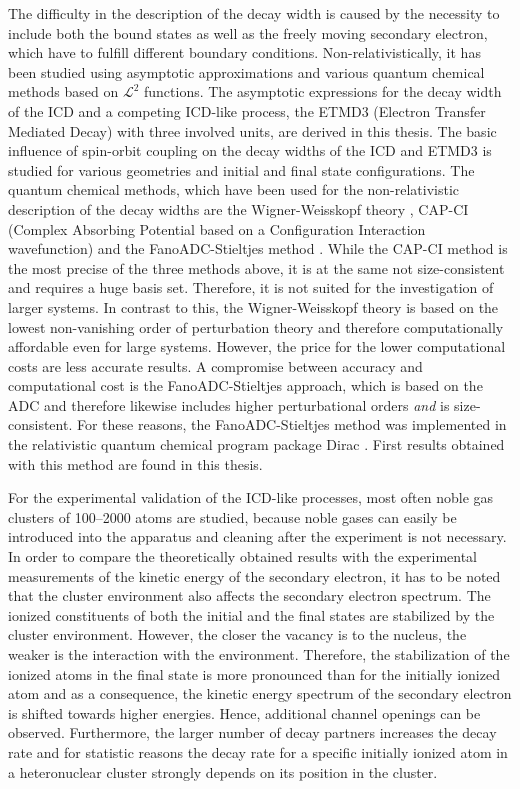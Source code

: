 The difficulty in the description of the decay width is caused by
the necessity to include both the bound states as well as the freely
moving secondary electron, which have to fulfill different boundary conditions.
Non-relativistically, it has been studied using asymptotic
approximations \cite{Gokhberg10_1} and various quantum chemical methods based
on $\mathcal{L}^2$ functions.
The asymptotic expressions for the decay width of the \ac{ICD} and a competing
\ac{ICD}-like process, the ETMD3 (Electron Transfer Mediated Decay) with three
involved units, are derived in this thesis. The basic influence of
spin-orbit coupling on the decay widths of the \ac{ICD} and ETMD3 is studied
for various geometries and initial and final state configurations.
The quantum chemical methods, which have been used for the non-relativistic 
description of the decay widths are the Wigner-Weisskopf theory \cite{Santra02},
CAP-CI
(Complex Absorbing Potential based on a Configuration Interaction wavefunction)
\cite{SakuraiModern94,Santra01_3} and the FanoADC-Stieltjes method
\cite{Averbukh05}.
While the CAP-CI method is the most precise of the three methods above,
it is at the same
not size-consistent and requires a huge basis set. Therefore, it is not
suited for the investigation of larger systems. In contrast to this, the
Wigner-Weisskopf theory is based on the lowest non-vanishing order of perturbation
theory and therefore computationally affordable even for large systems.
However, the price for the lower
computational costs are less accurate results. A compromise between
accuracy and computational cost is the FanoADC-Stieltjes approach, which
is based on the \ac{ADC} and therefore
likewise includes
higher perturbational orders \emph{and} is size-consistent.
For these reasons,
the FanoADC-Stieltjes method was implemented in the relativistic
quantum chemical program package Dirac \cite{DIRAC13}. First results
obtained with this method are found in this thesis.

For the experimental validation of the \ac{ICD}-like processes, most often
noble gas clusters of 100--2000 atoms are studied, because noble gases can
easily be introduced into the apparatus and cleaning after the experiment is
not necessary. In order to compare the
theoretically obtained results with the experimental measurements of the
kinetic energy of the secondary electron, it has
to be noted that the cluster environment also affects the secondary electron
spectrum.
The ionized constituents of both the initial and the final states are stabilized
by the cluster environment. However, the closer the vacancy is to the nucleus,
the weaker is the interaction with the environment.
Therefore, the stabilization of the ionized atoms in the final state is more
pronounced than for the initially ionized atom and as a consequence, the
kinetic energy spectrum of the secondary electron is shifted towards higher
energies.
Hence, additional channel openings can be observed.
Furthermore, the larger number of decay partners increases the decay rate
and for statistic reasons the decay rate for a specific initially ionized
atom in a heteronuclear cluster strongly depends on its position in the cluster.

